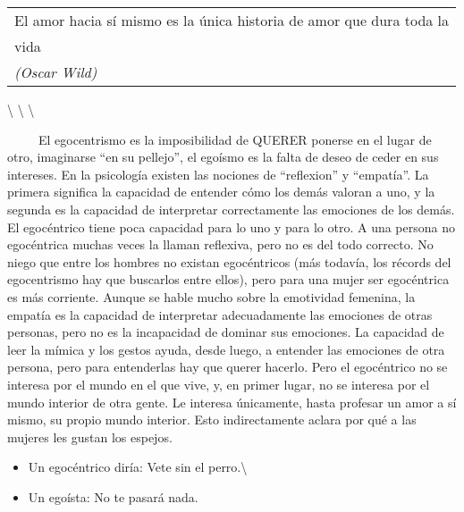 \begin{longtable}[]{@{}l@{}}
\toprule
El amor hacia sí mismo es la única historia de amor que dura toda
la\tabularnewline
vida\tabularnewline
\emph{(Oscar Wild)}\tabularnewline
\bottomrule
\end{longtable}

\textbackslash{} \textbackslash{} \textbackslash{}

~ ~ ~ El egocentrismo es la imposibilidad de QUERER ponerse en el lugar
de otro, imaginarse ``en su pellejo'', el egoísmo es la falta de deseo
de ceder en sus intereses. En la psicología existen las nociones de
``reflexion'' y ``empatía''. La primera significa la capacidad de
entender cómo los demás valoran a uno, y la segunda es la capacidad de
interpretar correctamente las emociones de los demás. El egocéntrico
tiene poca capacidad para lo uno y para lo otro. A una persona no
egocéntrica muchas veces la llaman reflexiva, pero no es del todo
correcto. No niego que entre los hombres no existan egocéntricos (más
todavía, los récords del egocentrismo hay que buscarlos entre ellos),
pero para una mujer ser egocéntrica es más corriente. Aunque se hable
mucho sobre la emotividad femenina, la empatía es la capacidad de
interpretar adecuadamente las emociones de otras personas, pero no es la
incapacidad de dominar sus emociones. La capacidad de leer la mímica y
los gestos ayuda, desde luego, a entender las emociones de otra persona,
pero para entenderlas hay que querer hacerlo. Pero el egocéntrico no se
interesa por el mundo en el que vive, y, en primer lugar, no se interesa
por el mundo interior de otra gente. Le interesa únicamente, hasta
profesar un amor a sí mismo, su propio mundo interior. Esto
indirectamente aclara por qué a las mujeres les gustan los espejos.

\begin{itemize}
\tightlist
\item
  Un egocéntrico diría: Vete sin el perro.\textbackslash{}
\item
  Un egoísta: No te pasará nada.
\end{itemize}

